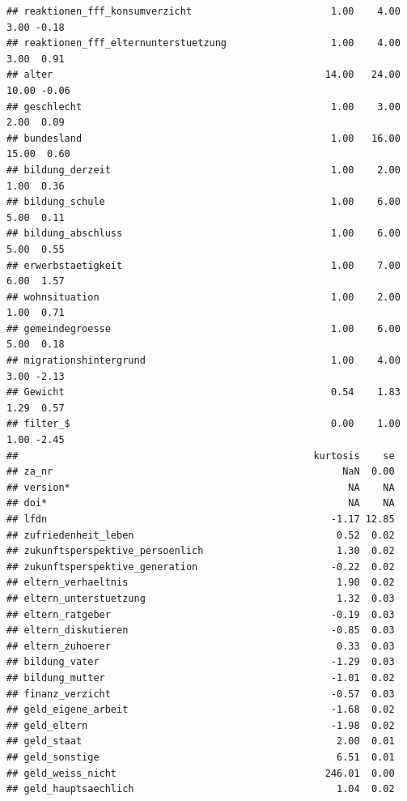 \documentclass[
]{book}
\begin{document}
\begin{verbatim}
## reaktionen_fff_konsumverzicht                        1.00    4.00    3.00 -0.18
## reaktionen_fff_elternunterstuetzung                  1.00    4.00    3.00  0.91
## alter                                               14.00   24.00   10.00 -0.06
## geschlecht                                           1.00    3.00    2.00  0.09
## bundesland                                           1.00   16.00   15.00  0.60
## bildung_derzeit                                      1.00    2.00    1.00  0.36
## bildung_schule                                       1.00    6.00    5.00  0.11
## bildung_abschluss                                    1.00    6.00    5.00  0.55
## erwerbstaetigkeit                                    1.00    7.00    6.00  1.57
## wohnsituation                                        1.00    2.00    1.00  0.71
## gemeindegroesse                                      1.00    6.00    5.00  0.18
## migrationshintergrund                                1.00    4.00    3.00 -2.13
## Gewicht                                              0.54    1.83    1.29  0.57
## filter_$                                             0.00    1.00    1.00 -2.45
##                                                   kurtosis    se
## za_nr                                                  NaN  0.00
## version*                                                NA    NA
## doi*                                                    NA    NA
## lfdn                                                 -1.17 12.85
## zufriedenheit_leben                                   0.52  0.02
## zukunftsperspektive_persoenlich                       1.30  0.02
## zukunftsperspektive_generation                       -0.22  0.02
## eltern_verhaeltnis                                    1.90  0.02
## eltern_unterstuetzung                                 1.32  0.03
## eltern_ratgeber                                      -0.19  0.03
## eltern_diskutieren                                   -0.85  0.03
## eltern_zuhoerer                                       0.33  0.03
## bildung_vater                                        -1.29  0.03
## bildung_mutter                                       -1.01  0.02
## finanz_verzicht                                      -0.57  0.03
## geld_eigene_arbeit                                   -1.68  0.02
## geld_eltern                                          -1.98  0.02
## geld_staat                                            2.00  0.01
## geld_sonstige                                         6.51  0.01
## geld_weiss_nicht                                    246.01  0.00
## geld_hauptsaechlich                                   1.04  0.02

\end{verbatim}
\end{document}
